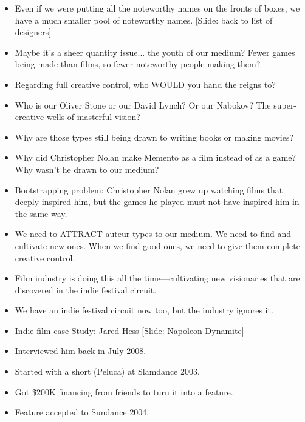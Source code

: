 \documentclass[12pt]{article}
\begin{document}
{\begin{itemize}
\item Even if we were putting all the noteworthy names on the fronts of boxes, we have a much smaller pool of noteworthy names. [Slide:  back to list of designers]

\item Maybe it's a sheer quantity issue... the youth of our medium?  Fewer games being made than films, so fewer noteworthy people making them?


\item Regarding full creative control, who WOULD you hand the reigns to?

\item Who is our Oliver Stone or our David Lynch?  Or our Nabokov?  The super-creative wells of masterful vision?

\item Why are those types still being drawn to writing books or making movies?

\item Why did Christopher Nolan make Memento as a film instead of as a game?  Why wasn't he drawn to our medium?

\item Bootstrapping problem:  Christopher Nolan grew up watching films that deeply inspired him, but the games he played must not have inspired him in the same way.  

\item We need to ATTRACT auteur-types to our medium.  We need to find and cultivate new ones.  When we find good ones, we need to give them complete creative control.

\item Film industry is doing this all the time---cultivating new visionaries that are discovered in the indie festival circuit.

\item We have an indie festival circuit now too, but the industry ignores it.

\item Indie film case Study:  Jared Hess [Slide:  Napoleon Dynamite]

\item Interviewed him back in July 2008.

\item Started with a short (Peluca) at Slamdance 2003.

\item Got \$200K financing from friends to turn it into a feature.

\item Feature accepted to Sundance 2004.


\end{itemize}}
\end{document}

